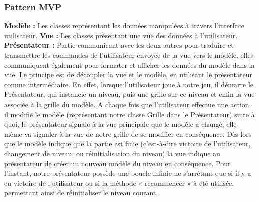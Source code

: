 \documentclass[a4paper,12pt]{article} %
\begin{document}
\subsubsection{Pattern MVP}
\noindent
\textbf{Modèle :}
\newline\newline
Les classes représentant les données manipulées à travers l'interface utilisateur.
\newline\newline
\noindent
\textbf{Vue :}
\newline\newline
Les classes présentant une vue des données à l'utilisateur.
\newline\newline
\noindent
\textbf{Présentateur :}
\newline\newline
Partie communicant avec les deux autres pour traduire et transmettre les commandes de l'utilisateur envoyée de la vue vers le modèle, elles communiquent également pour formater et afficher les données du modèle dans la vue.
\newline
Le principe est de découpler la vue et le modèle, en utilisant le présentateur comme intermédiaire.
\newline\newline
En effet, lorsque l’utilisateur joue à notre jeu, il démarre le Présentateur, qui instancie un niveau, puis une grille sur ce niveau et enfin la vue associée à la grille du modèle. A chaque fois que l’utilisateur effectue une action, il modifie le modèle (représentant notre classe Grille dans le Présentateur) suite à quoi, le présentateur signale à la vue principale que le modèle a changé, elle-même va signaler à la vue de notre grille de se modifier en conséquence.
\newline
Dès lors que le modèle indique que la partie est finie (c’est-à-dire victoire de l’utilisateur, changement de niveau, ou réinitialisation du niveau) la vue indique au présentateur de créer un nouveau modèle du niveau en conséquence. 
\newline
Pour l’instant, notre présentateur possède une boucle infinie ne s’arrêtant que si il y a eu victoire de l’utilisateur ou si la méthode « recommencer » à été utilisée, permettant ainsi de réinitialiser le niveau courant.
\newline\newline
\end{document}
